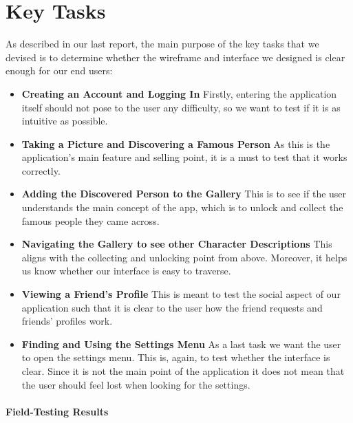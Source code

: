 \documentclass[12pt]{scrartcl}
\begin{document}
	
\section{Key Tasks}

	
	As described in our last report, the main purpose of the key tasks that we devised is to determine 
	whether the wireframe and interface we designed is clear enough for our end users:
	
	\begin{itemize}
	\item  \textbf{Creating an Account and Logging In} Firstly, entering the application itself should
	not pose to the user any difficulty, so we want to test if it is as intuitive as possible.
	
	\item \textbf{Taking a Picture and Discovering a Famous Person} As this is the application's main
	feature and selling point, it is a must to test that it works correctly.
	
	\item \textbf{Adding the Discovered Person to the Gallery} This is to see if the user
	understands the main concept of the app, which is to unlock and collect the famous people
	they came across.
	
	\item \textbf{Navigating the Gallery to see other Character Descriptions} This aligns with the
	collecting and unlocking point from above. Moreover, it helps us know whether our interface is
	easy to traverse.
	
	\item \textbf{Viewing a Friend's Profile} This is meant to test the social aspect of our application
	such that it is clear to the user how the friend requests and friends' profiles work.
	
	\item \textbf{Finding and Using the Settings Menu} As a last task we want the user to open the
	settings menu. This is, again, to test whether the interface is clear. Since it is not the main point
	of the application it does not mean that the user should feel lost when looking for the settings.
	\end{itemize}
	
	\paragraph{\large Field-Testing Results}
	
\end{document}
